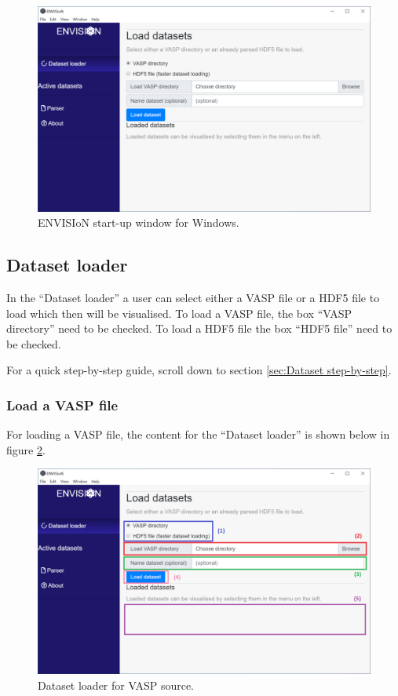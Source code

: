\begin{figure}[H]
    \centering
    \includegraphics[scale = 0.4]{Images/GUI_start_Windows.png}
    \caption{ENVISIoN start-up window for Windows.}
    \label{fig:GUIStartupUbuntu}
\end{figure}

\subsection{Dataset loader}
In the ``Dataset loader'' a user can select either a VASP file or a HDF5 file to load which then will be visualised. To load a VASP file, the box ``VASP directory'' need to be checked. To load a HDF5 file the box ``HDF5 file'' need to be checked. 

For a quick step-by-step guide, scroll down to section \ref{sec:Dataset step-by-step}.

\subsubsection{Load a VASP file}
For loading a VASP file, the content for the ``Dataset loader'' is shown below in figure \ref{fig:GUIDatasetloaderVASP}.

\begin{figure}[H]
    \centering
    \includegraphics[scale = 0.45]{Images/GUI_Datasetloader_VASP.png}
    \caption{Dataset loader for VASP source.}
    \label{fig:GUIDatasetloaderVASP}
\end{figure}

